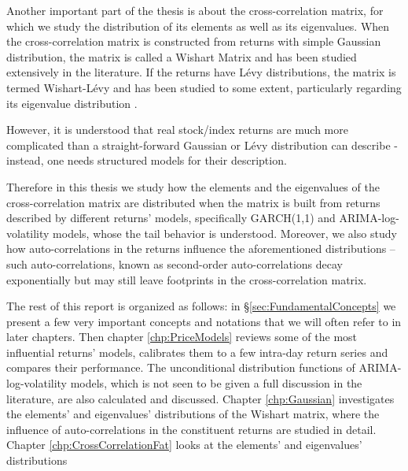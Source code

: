 \documentclass{report}
\begin{document}


Another important part of the thesis is about the cross-correlation
matrix, for which we study the distribution of its elements as well
as its eigenvalues. When the cross-correlation matrix is constructed
from returns with simple Gaussian distribution, the matrix is called a
Wishart Matrix and has been studied extensively in the literature. If
the returns have L\'evy distributions, the matrix is termed
Wishart-L\'evy and has been studied to some extent, particularly
regarding its eigenvalue distribution \cite{politi2010}.

However, it is understood that real stock/index returns are much more
complicated than a straight-forward Gaussian or L\'evy distribution can
describe - instead, one needs structured models for their description.

Therefore in this thesis we study how the elements and the eigenvalues
of the cross-correlation matrix are distributed when the matrix is
built from returns described by different returns' models, specifically
GARCH(1,1) and ARIMA-log-volatility models, whose the tail behavior is
understood. Moreover, we also study how auto-correlations in the
returns influence the aforementioned distributions -- such
auto-correlations, known as second-order auto-correlations decay
exponentially but may still leave footprints in the cross-correlation
matrix.

The rest of this report is organized as follows: in
\S\ref{sec:FundamentalConcepts} we present a few very important
concepts and notations that we will often refer to in later
chapters. Then chapter \ref{chp:PriceModels} reviews some of the most
influential returns' models, calibrates them to a few intra-day return
series and compares their performance. The unconditional distribution
functions of ARIMA-log-volatility models, which is not seen to be
given a full discussion in the literature, are also calculated and
discussed. Chapter \ref{chp:Gaussian} investigates the elements' and
eigenvalues' distributions of the Wishart matrix, where the influence
of auto-correlations in the constituent returns are studied in
detail. Chapter \ref{chp:CrossCorrelationFat} looks at the elements'
and eigenvalues' distributions 
\end{document}
